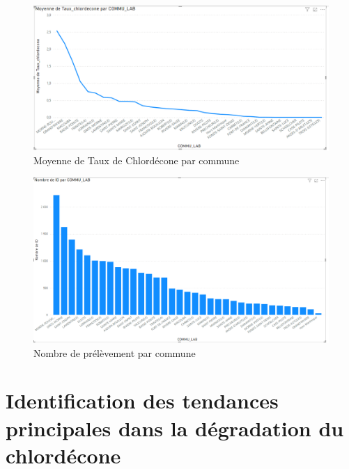 \documentclass{report}
\begin{document}
\begin{figure}[H]
\centering
\includegraphics[width = 1
\linewidth]{moyenne_taux_chlordecone_par_commune.png}
\caption{Moyenne de Taux de Chlordécone par commune}
\end{figure}

\begin{figure}[H]
\centering
\includegraphics[width = 1
\linewidth]{nombre_prel_par_commune.png}
\caption{Nombre de prélèvement par commune}
\end{figure}
 
\section*{Identification des tendances principales dans la dégradation du chlordécone }
\end{document}
